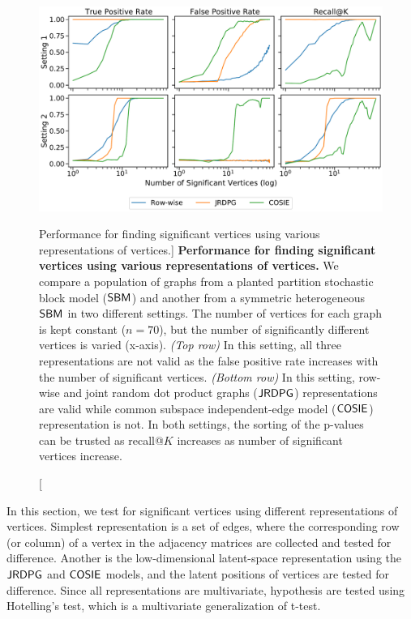 \begin{figure} 
    \centering
    \includegraphics[width=.8\textwidth]{figures/dnd/exp7_new}
    \caption
    [Performance for finding significant vertices using various representations of vertices.]
    {\textbf{Performance for finding significant vertices using various representations of vertices.} We compare a population of graphs from a planted partition stochastic block model ($\operatorname{\mathsf{SBM}}$) and another from a symmetric heterogeneous $\operatorname{\mathsf{SBM}}$ in two different settings. The number of vertices for each graph is kept constant ($n=70$), but the number of significantly different vertices is varied (x-axis). \textit{(Top row)} In this setting, all three representations are not valid as the false positive rate increases with the number of significant vertices. \textit{(Bottom row)} In this setting, row-wise and joint random dot product graphs ($\operatorname{\mathsf{JRDPG}}$) representations are valid while common subspace independent-edge model ($\operatorname{\mathsf{COSIE}}$) representation is not. 
    In both settings, the sorting of the p-values can be trusted as recall@$K$ increases as number of significant vertices increase.
    }
    \label{fig:exp7}
\end{figure} 

In this section, we test for significant vertices using different representations of vertices. 
Simplest representation is a set of edges, where the corresponding row (or column) of a vertex in the adjacency matrices are collected and tested for difference. 
Another is the low-dimensional latent-space representation using the $\operatorname{\mathsf{JRDPG}}$ and $\operatorname{\mathsf{COSIE}}$ models, and the latent positions of vertices are tested for difference. Since all representations are multivariate, hypothesis are tested using Hotelling's test, which is a multivariate generalization of t-test.

